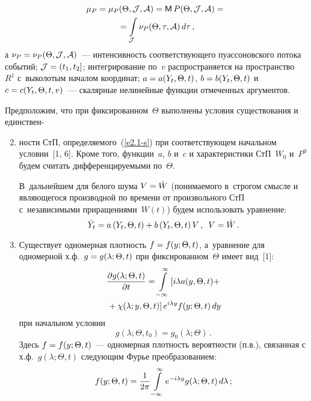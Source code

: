 \begin{multicols}{2}
\begin{enumerate}[1.]
\noindent
    \begin{multline*}
    \mu_P =\mu_P(\Theta, {\cal J},{\cal A})={\sf M}\, P(\Theta, {\cal J},{\cal A})= {}\\
    {}=
    \int\limits_{\cal J} \nu_P (\Theta, \tau,{\cal A})\, d\tau\,,
\end{multline*}
а $\nu_P\hm=\nu_P(\Theta, {\cal J},{\cal A})$~--- 
интенсивность соответствующего пуассоновского потока событий; 
${\cal J}\hm= (t_1, t_2]$; интегрирование по~$v$ распространяется на пространство~$R^1$ 
с~выколотым началом координат; $a\hm=a(Y_t, \Theta, t)$, $b\hm=b(Y_t, \Theta, t)$ 
и~$c\hm=c(Y_t, \Theta, t,v)$~--- скалярные нелинейные функции отмеченных аргументов.

Предположим, что при фиксированном~$\Theta$ выполнены условия 
существования и единствен-\linebreak\vspace*{-12pt}
\end{enumerate}

\begin{enumerate}[1.]
\setcounter{enumi}{1}
\item[\ ] ности СтП, определяемого~(\ref{e2.1-s}) 
при соответствующем начальном условии~[1, 6]. Кроме того, функции~$a$,
$b$ и~$c$ и характеристики СтП~$W_0$ и~$P^0$ будем считать дифференцируемыми по~$\Theta$.

В~дальнейшем для белого шума $V\hm=\dot W$ (понимаемого 
в~строгом смысле и являющегося производной по времени от произвольного СтП 
с~независимыми приращениями~$W(t)$) будем использовать уравнение:
\begin{equation}
\dot Y_t =a\left(Y_t, \Theta, t\right)+ 
b\left(Y_t, \Theta, t\right)V\,, \enskip 
V=\dot W\,.\label{e2.2-s}
\end{equation}

\item Существует одномерная плотность $f\hm=f(y;\Theta,t)$, 
а~уравнение для одномерной х.ф.\ $g\hm=g(\lambda;\Theta,t)$  при фиксированном~$\Theta$ 
имеет вид~[1]:
\begin{multline}
    \displaystyle\frac{\displaystyle \partial g (\lambda;\Theta,t)\mathstrut}{\displaystyle \partial t\mathstrut} = \int\limits_{-\infty}^\infty \left[ i\lambda a 
    (y,\Theta,t)+ \right.\\
\left.    {}+\chi(\lambda;y,\Theta,t)\right] e^{i\lambda y} f ( y; \Theta,t)\, dy
    \label{e2.3-s}
    \end{multline}
при начальном условии
\begin{equation}
g(\lambda; \Theta,t_0) = g_0 (\lambda;\Theta)\,.
\label{e2.4-s}
\end{equation}
Здесь $f\hm=f(y;\Theta,t)$~--- одномерная плотность вероятности (п.в.), 
связанная с х.ф.~$g(\lambda;\Theta,t)$ следующим Фурье преобразованием:
\begin{equation}
f(y;\Theta,t) = \displaystyle\frac{\displaystyle 1\mathstrut}{\displaystyle 2\pi\mathstrut} \int\limits_{-\infty}^\infty e^{-i\lambda y} g 
(\lambda;\Theta,t)\, d\lambda\,;\label{e2.5-s}
\end{equation}


\end{enumerate}
\end{multicols}
